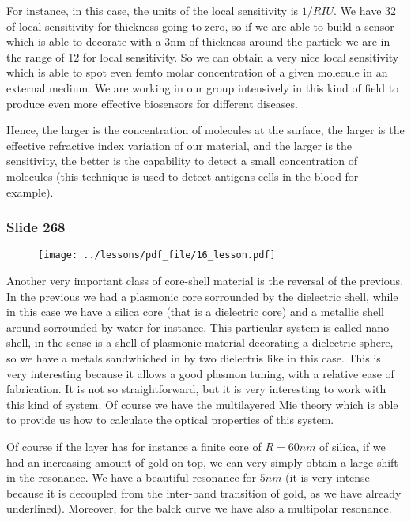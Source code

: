 \documentclass[../main/main.tex]{subfiles}
\begin{document}
For instance, in this case, the units of the local sensitivity is \( 1/RIU \). We have 32 of local sensitivity for thickness going to zero, so if we are able to build a sensor which is able to decorate with a 3nm of thickness around the particle we are in the range of 12 for local sensitivity. So we can obtain a very nice local sensitivity which is able to spot even femto molar concentration of a given molecule in an external medium. We are working in our group intensively in this kind of field to produce even more effective biosensors for different diseases.


\begin{remark}
Hence, the larger is the concentration of molecules at the surface, the larger is the effective refractive index variation of our material, and the larger is the sensitivity, the better is the capability to detect a small concentration of molecules (this technique is used to detect antigens cells in the blood for example).
\end{remark}


\newpage

\subsubsection{Slide 268}

\begin{figure}[h!]
\centering
\texttt{[image: ../lessons/pdf\_file/16\_lesson.pdf]}
\end{figure}

Another very important class of core-shell material is the reversal of the previous. In the previous we had a plasmonic core sorrounded by the dielectric shell, while in this case we have a silica core (that is a dielectric core) and a metallic shell around sorrounded by water for instance. This particular system is called nano-shell, in the sense is a shell of plasmonic material decorating a dielectric sphere, so we have a metals sandwhiched in by two dielectris like in this case.
This is very interesting because it allows a good plasmon tuning, with a relative ease of fabrication. It is not so straightforward, but it is very interesting to work with this kind of system.
Of course we have the multilayered Mie theory which is able to provide us how to calculate the optical properties of this system.

Of course if the layer has for instance a finite core of \( R=60nm \) of silica, if we had an increasing amount of gold on top, we can very simply obtain a large shift in the resonance. We have a beautiful resonance for \( 5nm \) (it is very intense because it is decoupled from the inter-band transition of gold, as we have already underlined). Moreover, for the balck curve we have also a multipolar resonance.
\end{document}
